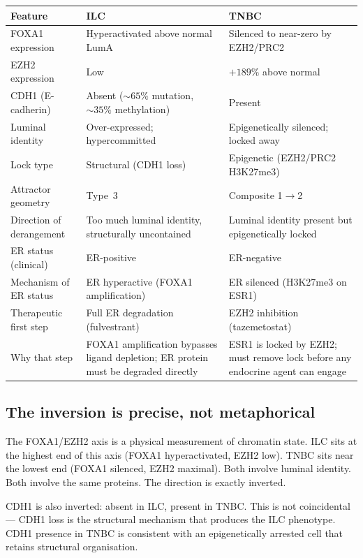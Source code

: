 \documentclass[12pt, a4paper]{article}
\begin{document}
\begin{center}
\begin{tabular}{p{3.5cm}p{4cm}p{4cm}}
\toprule
\textbf{Feature} &
\textbf{\textcolor{green!50!black}{ILC}} &
\textbf{\textcolor{red!70!black}{TNBC}} \\
\midrule
FOXA1 expression &
Hyperactivated above
normal LumA &
Silenced to near-zero
by EZH2/PRC2 \\[0.4em]
EZH2 expression &
Low &
$+189\%$ above normal \\[0.4em]
CDH1 (E-cadherin) &
Absent
(${\sim}65\%$ mutation,
${\sim}35\%$ methylation) &
Present \\[0.4em]
Luminal identity &
Over-expressed;
hypercommitted &
Epigenetically silenced;
locked away \\[0.4em]
Lock type &
Structural (CDH1 loss) &
Epigenetic
(EZH2/PRC2 H3K27me3) \\[0.4em]
Attractor geometry &
Type~3 &
Composite 1$\rightarrow$2 \\[0.4em]
Direction of derangement &
Too much luminal identity,
structurally uncontained &
Luminal identity present
but epigenetically locked \\[0.4em]
ER status (clinical) &
ER-positive &
ER-negative \\[0.4em]
Mechanism of ER status &
ER hyperactive
(FOXA1 amplification) &
ER silenced
(H3K27me3 on ESR1) \\[0.4em]
Therapeutic first step &
Full ER degradation
(fulvestrant) &
EZH2 inhibition
(tazemetostat) \\[0.4em]
Why that step &
FOXA1 amplification bypasses
ligand depletion; ER protein
must be degraded directly &
ESR1 is locked by EZH2;
must remove lock before
any endocrine agent can engage \\
\bottomrule
\end{tabular}
\end{center}

\subsection{The inversion is precise, not
metaphorical}

The FOXA1/EZH2 axis is a physical measurement
of chromatin state. ILC sits at the highest
end of this axis (FOXA1 hyperactivated, EZH2
low). TNBC sits near the lowest end (FOXA1
silenced, EZH2 maximal). Both involve luminal
identity. Both involve the same proteins. The
direction is exactly inverted.

CDH1 is also inverted: absent in ILC, present
in TNBC. This is not coincidental --- CDH1 loss
is the structural mechanism that produces the
ILC phenotype. CDH1 presence in TNBC is
consistent with an epigenetically arrested
cell that retains structural organisation.
\end{document}
